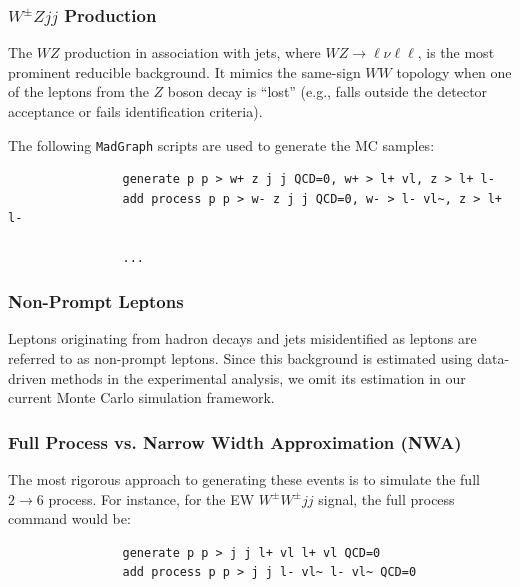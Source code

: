 \documentclass[12pt]{article}
\begin{document}

        \subsubsection{\texorpdfstring{$W^{\pm}Zjj$}{WZjj} Production}%
        \label{subs:wzjj_production}

            The $WZ$ production in association with jets, where $WZ \to \ell\nu\ell\ell$, is the most prominent reducible background. It mimics the same-sign $WW$ topology when one of the leptons from the $Z$ boson decay is ``lost'' (e.g., falls outside the detector acceptance or fails identification criteria).

            The following \verb|MadGraph| scripts are used to generate the MC samples:
            \begin{lstlisting}
                generate p p > w+ z j j QCD=0, w+ > l+ vl, z > l+ l-
                add process p p > w- z j j QCD=0, w- > l- vl~, z > l+ l-

                ...
            \end{lstlisting}


        \subsubsection{Non-Prompt Leptons}%
        \label{subs:non_prompt_lepton}

            Leptons originating from hadron decays and jets misidentified as leptons are referred to as non-prompt leptons. Since this background is estimated using data-driven methods in the experimental analysis, we omit its estimation in our current Monte Carlo simulation framework.


        \subsubsection{Full Process vs. Narrow Width Approximation (NWA)}%
        \label{subs:full_process_and_nwa}

            The most rigorous approach to generating these events is to simulate the full $2 \to 6$ process. For instance, for the EW $W^{\pm}W^{\pm}jj$ signal, the full process command would be:
            \begin{lstlisting}
                generate p p > j j l+ vl l+ vl QCD=0
                add process p p > j j l- vl~ l- vl~ QCD=0
            \end{lstlisting}
\end{document}

